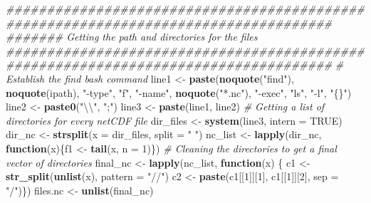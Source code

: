 \documentclass[]{book}
\newenvironment{Shaded}{\begin{snugshade}}{\end{snugshade}}
\newcommand{\CharTok}[1]{\textcolor[rgb]{0.31,0.60,0.02}{#1}}
\newcommand{\CommentTok}[1]{\textcolor[rgb]{0.56,0.35,0.01}{\textit{#1}}}
\newcommand{\ControlFlowTok}[1]{\textcolor[rgb]{0.13,0.29,0.53}{\textbf{#1}}}
\newcommand{\DataTypeTok}[1]{\textcolor[rgb]{0.13,0.29,0.53}{#1}}
\newcommand{\DecValTok}[1]{\textcolor[rgb]{0.00,0.00,0.81}{#1}}
\newcommand{\KeywordTok}[1]{\textcolor[rgb]{0.13,0.29,0.53}{\textbf{#1}}}
\newcommand{\NormalTok}[1]{#1}
\newcommand{\OtherTok}[1]{\textcolor[rgb]{0.56,0.35,0.01}{#1}}
\newcommand{\StringTok}[1]{\textcolor[rgb]{0.31,0.60,0.02}{#1}}
\begin{document}
\begin{Shaded}
\begin{Highlighting}[]
{\CommentTok{####################################################################################}
\CommentTok{####### Getting the path and directories for the files}
\CommentTok{####################################################################################}
  \CommentTok{# Establish the find bash command}
\NormalTok{    line1 <-}\StringTok{ }\KeywordTok{paste}\NormalTok{(}\KeywordTok{noquote}\NormalTok{(}\StringTok{"find"}\NormalTok{), }\KeywordTok{noquote}\NormalTok{(ipath), }\StringTok{"-type"}\NormalTok{, }\StringTok{"f"}\NormalTok{, }\StringTok{"-name"}\NormalTok{, }
                   \KeywordTok{noquote}\NormalTok{(}\StringTok{"*.nc"}\NormalTok{), }\StringTok{"-exec"}\NormalTok{, }\StringTok{"ls"}\NormalTok{, }\StringTok{"-l"}\NormalTok{, }\StringTok{"\{\}"}\NormalTok{)}
\NormalTok{    line2 <-}\StringTok{ }\KeywordTok{paste0}\NormalTok{(}\StringTok{"}\CharTok{\textbackslash{}\textbackslash{}}\StringTok{"}\NormalTok{, }\StringTok{";"}\NormalTok{)}
\NormalTok{    line3 <-}\StringTok{ }\KeywordTok{paste}\NormalTok{(line1, line2)}
  \CommentTok{# Getting a list of directories for every netCDF file}
\NormalTok{    dir_files <-}\StringTok{ }\KeywordTok{system}\NormalTok{(line3, }\DataTypeTok{intern =} \OtherTok{TRUE}\NormalTok{)}
\NormalTok{    dir_nc <-}\StringTok{ }\KeywordTok{strsplit}\NormalTok{(}\DataTypeTok{x =}\NormalTok{ dir_files, }\DataTypeTok{split =} \StringTok{" "}\NormalTok{)}
\NormalTok{    nc_list <-}\StringTok{ }\KeywordTok{lapply}\NormalTok{(dir_nc, }\ControlFlowTok{function}\NormalTok{(x)\{f1 <-}\StringTok{ }\KeywordTok{tail}\NormalTok{(x, }\DataTypeTok{n =} \DecValTok{1}\NormalTok{)\})}
  \CommentTok{# Cleaning the directories to get a final vector of directories}
\NormalTok{    final_nc <-}\StringTok{ }\KeywordTok{lapply}\NormalTok{(nc_list, }\ControlFlowTok{function}\NormalTok{(x) \{}
\NormalTok{      c1 <-}\StringTok{ }\KeywordTok{str_split}\NormalTok{(}\KeywordTok{unlist}\NormalTok{(x), }\DataTypeTok{pattern =} \StringTok{"//"}\NormalTok{)}
\NormalTok{      c2 <-}\StringTok{ }\KeywordTok{paste}\NormalTok{(c1[[}\DecValTok{1}\NormalTok{]][}\DecValTok{1}\NormalTok{], c1[[}\DecValTok{1}\NormalTok{]][}\DecValTok{2}\NormalTok{], }\DataTypeTok{sep =} \StringTok{"/"}\NormalTok{)\})}
\NormalTok{    files.nc <-}\StringTok{ }\KeywordTok{unlist}\NormalTok{(final_nc)}
 
}
\end{Highlighting}
\end{Shaded}
\end{document}
